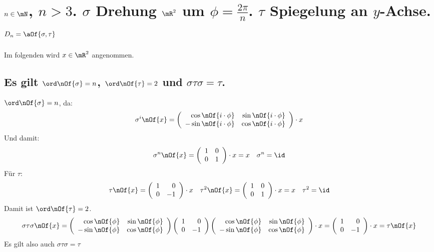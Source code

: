 \documentclass[11pt,a4paper]{scrartcl}
\newcommand{\tauMat}{\left(\begin{array}{r r} 1 & 0 \\ 0 & -1\end{array}\right)}
\newcommand{\idMat}{\left(\begin{array}{r r} 1 & 0 \\ 0 & 1\end{array}\right)}
\newcommand{\sigMat}{\left(\begin{array}{r r} \cos \nOf{\phi} & \sin \nOf{\phi} \\ -\sin \nOf{\phi} & \cos \nOf{\phi} \end{array}\right)}
\newcommand{\sigiMt}{\left(\begin{array}{r r} \cos \nOf{i\cdot\phi} & \sin \nOf{i\cdot\phi} \\ -\sin \nOf{i\cdot\phi} & \cos \nOf{i\cdot\phi} \end{array}\right)}
\begin{document}
\section{$n\in \mN$, $n > 3$. $\sigma$ Drehung $\mR^2$ um $\phi = \frac{2\pi}{n}$. $\tau$ Spiegelung an $y$-Achse. $D_n = \aOf{\sigma,\tau}$}
Im folgenden wird $x\in \mR^2$ angenommen.
\subsection{Es gilt $\ord\nOf{\sigma} = n$, $\ord\nOf{\tau} = 2$ und $\sigma\tau\sigma = \tau$.}
$\ord\nOf{\sigma} = n$, da:
\begin{equation}
	\sigma^i\nOf{x} = \sigiMt \cdot x
\end{equation}
Und damit:
\begin{equation}
	\sigma^n\nOf{x} = \idMat \cdot x = x \quad \sigma^n = \id
\end{equation}
Für $\tau$:
\begin{equation}
	\tau\nOf{x} = \tauMat\cdot x \quad \tau^2\nOf{x} = \left(\begin{array}{r r} 1 & 0 \\ 0 & 1\end{array}\right)\cdot x = x \quad \tau^2 = \id
\end{equation}
Damit ist $\ord\nOf{\tau} = 2$.
\begin{equation}
	\sigma\tau\sigma\nOf{x} = \sigMat \tauMat \sigMat \cdot x = \tauMat \cdot x = \tau\nOf{x}
\end{equation}
Es gilt also auch $\sigma\tau\sigma = \tau$
\end{document}
